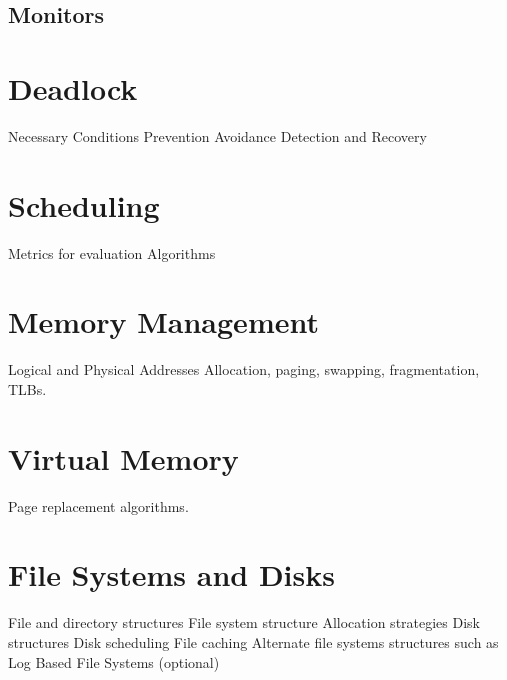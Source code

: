 \documentclass[12pt]{article}
\begin{document}
\subsection{Monitors}

\bigskip

\section*{Deadlock}
    Necessary Conditions
    Prevention
    Avoidance
    Detection and Recovery
\section*{Scheduling}
    Metrics for evaluation
    Algorithms
\section*{Memory Management}
    Logical and Physical Addresses
    Allocation, paging, swapping, fragmentation, TLBs.
\section*{Virtual Memory}
    Page replacement algorithms.
\section*{File Systems and Disks}
    File and directory structures
    File system structure
    Allocation strategies
    Disk structures
    Disk scheduling
    File caching
    Alternate file systems structures such as Log Based File Systems (optional)
\end{document}

